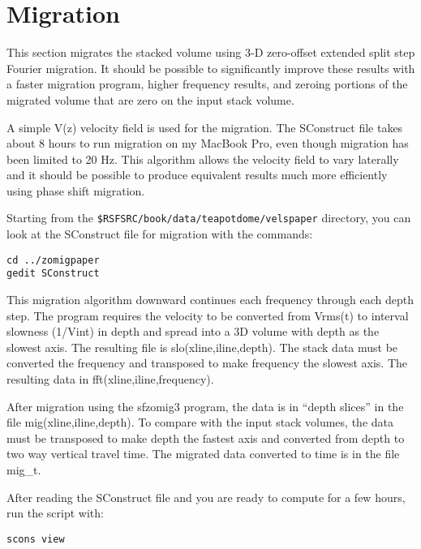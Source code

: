 

\section{Migration}

This section migrates the stacked volume using 3-D zero-offset extended split step Fourier migration.  It should be possible to significantly improve these results with a faster migration program, higher frequency results, and zeroing portions of the migrated volume that are zero on the input stack volume.

A simple V(z) velocity field is used for the migration.  The SConstruct file takes about 8 hours to run migration on my MacBook Pro, even though migration has been limited to 20 Hz.   This algorithm allows the velocity field to vary laterally and it should be possible to produce equivalent results much more efficiently using phase shift migration.
 
Starting from the \texttt{\$RSFSRC/book/data/teapotdome/velspaper} directory, you can look at the SConstruct file for migration with the commands:
\begin{verbatim}  
cd ../zomigpaper
gedit SConstruct
\end{verbatim}  

This migration algorithm downward continues each frequency through each depth step.  The program requires the velocity to be converted from Vrms(t) to interval slowness (1/Vint) in depth and spread into a 3D volume with depth as the slowest axis.  The resulting file is slo(xline,iline,depth).  The stack data must be converted the frequency and transposed to make frequency the slowest axis.  The resulting data in fft(xline,iline,frequency).  
 
After migration using the sfzomig3 program, the data is in “depth slices” in the file mig(xline,iline,depth).  To compare with the input stack volumes, the data must be transposed to make depth the fastest axis and converted from depth to two way vertical travel time.  The migrated data converted to time is in the file mig\_t.

After reading the SConstruct file and you are ready to compute for a few hours, run the script with:
\begin{verbatim}  
scons view
\end{verbatim}  

